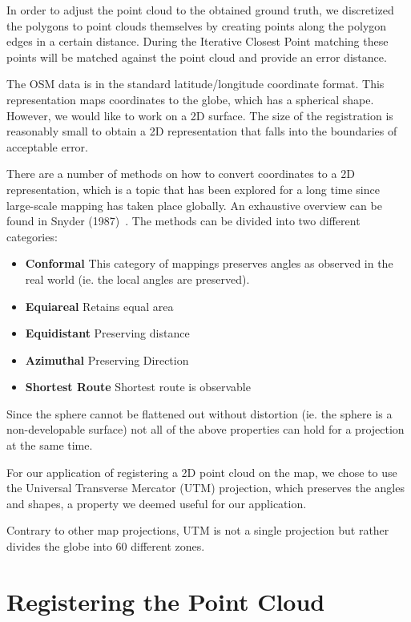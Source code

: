 \documentclass[10pt,twocolumn,letterpaper]{article}
\begin{document}
In order to adjust the point cloud to the obtained ground truth, we discretized the polygons to point clouds themselves by creating points along the polygon edges in a certain distance. During the Iterative Closest Point matching these points will be matched against the point cloud and provide an error distance.

The OSM data is in the standard latitude/longitude coordinate format. This representation maps coordinates to the globe, which has a spherical shape. However, we would like to work on a 2D surface. The size of the registration is reasonably small to obtain a 2D representation that falls into the boundaries of acceptable error.

There are a number of methods on how to convert coordinates to a 2D representation, which is a topic that has been explored for a long time since large-scale mapping has taken place globally. An exhaustive overview can be found in Snyder (1987)~\cite{Snyder1987}. The methods can be divided into two different categories:

\begin{itemize}
   \item \textbf{Conformal} This category of mappings preserves angles as observed in the real world (ie. the local angles are preserved). 
   \item \textbf{Equiareal} Retains equal area
   \item \textbf{Equidistant} Preserving distance
   \item \textbf{Azimuthal} Preserving Direction
   \item \textbf{Shortest Route} Shortest route is observable 
\end{itemize}

Since the sphere cannot be flattened out without distortion (ie. the sphere is a non-developable surface) not all of the above properties can hold for a projection at the same time.

For our application of registering a 2D point cloud on the map, we chose to use the Universal Transverse Mercator (UTM) projection, which preserves the angles and shapes, a property we deemed useful for our application.

Contrary to other map projections, UTM is not a single projection but rather divides the globe into 60 different zones.

\section{Registering the Point Cloud}
\end{document}
